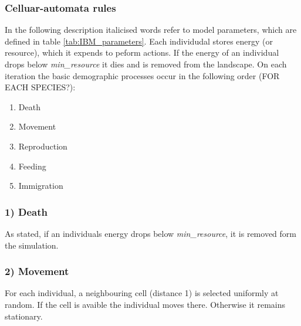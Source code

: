 \subsubsection{Celluar-automata rules}
\label{sec:CA_rules}

In the following description italicised words refer to model parameters, which are defined in table \ref{tab:IBM_parameters}. Each individudal stores energy (or resource), which it expends to peform actions. If the energy of an individual drops below \emph{min\_resource} it dies and is removed from the landscape. On each iteration the basic demographic processes occur in the following order  (FOR EACH SPECIES?):

\begin{enumerate}
	\item Death
	\item Movement
	\item Reproduction
	\item Feeding
	\item Immigration
\end{enumerate}

\subsubsection*{1) Death}
As stated, if an individuals energy drops below \emph{min\_resource}, it is removed form the simulation.
\subsubsection*{2) Movement}
For each individual, a neighbouring cell (distance 1) is selected uniformly at random. If the cell is avaible the individual moves there. Otherwise it remains stationary.
